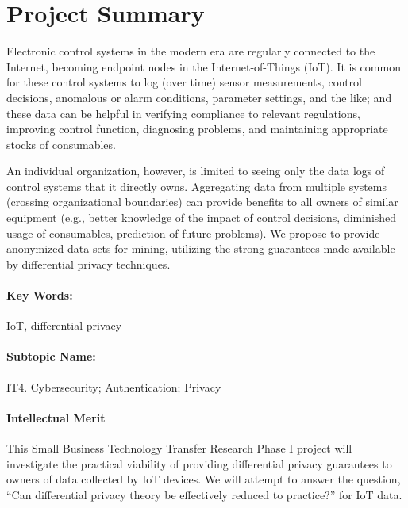 \clearpage
\section*{Project Summary}

%

Electronic control systems in the modern era are regularly connected
to the Internet, becoming endpoint nodes in the Internet-of-Things (IoT).
It is common for these control systems to log (over time) sensor measurements,
control decisions, anomalous or alarm conditions, parameter settings,
and the like; and these data can be helpful in verifying compliance to
relevant regulations, improving control function, diagnosing problems,
and maintaining appropriate stocks of consumables.

An individual organization, however, is limited to seeing only the data logs
of control systems that it directly owns. Aggregating data from multiple
systems (crossing organizational boundaries) can provide benefits to all
owners of similar equipment (e.g., better knowledge of the impact of
control decisions, diminished usage of consumables, prediction of future
problems). We propose to provide anonymized data sets for mining, utilizing
the strong guarantees made available by differential privacy techniques.

\paragraph{Key Words:} IoT, differential privacy

\paragraph{Subtopic Name:} IT4. Cybersecurity; Authentication; Privacy

\medskip

\paragraph{Intellectual Merit}
This Small Business Technology Transfer Research Phase I project will
investigate
the practical viability of providing differential privacy guarantees to
owners of data collected by IoT devices.  We will attempt to answer the
question, ``Can differential privacy theory be effectively reduced to
practice?'' for IoT data.

